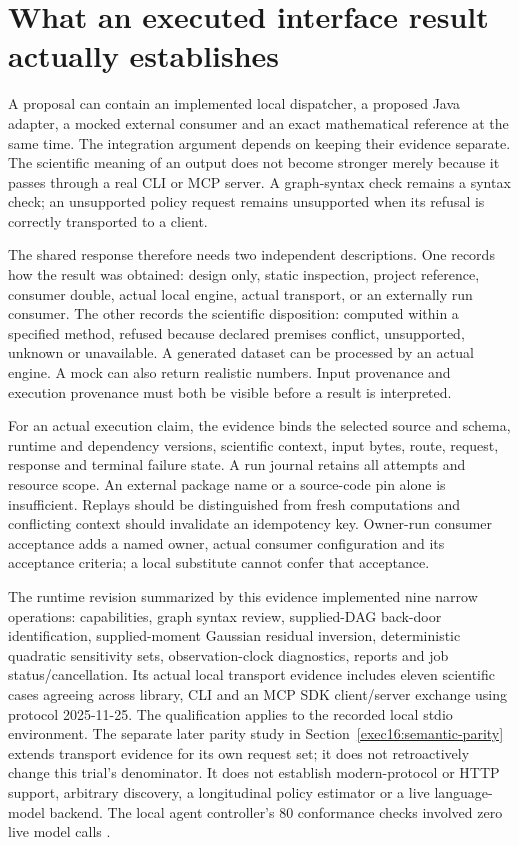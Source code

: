 \section{What an executed interface result actually establishes}
\label{exec14:execution-meaning}

A proposal can contain an implemented local dispatcher, a proposed Java adapter,
a mocked external consumer and an exact mathematical reference at the same time.
The integration argument depends on keeping their evidence separate. The
scientific meaning of an output does not become stronger merely because it
passes through a real CLI or MCP server. A graph-syntax check remains a syntax
check; an unsupported policy request remains unsupported when its refusal is
correctly transported to a client.

The shared response therefore needs two independent descriptions. One records
how the result was obtained: design only, static inspection, project reference,
consumer double, actual local engine, actual transport, or an externally run
consumer. The other records the scientific disposition: computed within a
specified method, refused because declared premises conflict, unsupported,
unknown or unavailable. A generated dataset can be processed by an actual
engine. A mock can also return realistic numbers. Input provenance and execution
provenance must both be visible before a result is interpreted.

For an actual execution claim, the evidence binds the selected source and
schema, runtime and dependency versions, scientific context, input bytes,
route, request, response and terminal failure state. A run journal retains all
attempts and resource scope. An external package name or a source-code pin alone
is insufficient. Replays should be distinguished from fresh computations and
conflicting context should invalidate an idempotency key. Owner-run consumer
acceptance adds a named owner, actual consumer configuration and its acceptance
criteria; a local substitute cannot confer that acceptance.

The runtime revision summarized by this evidence implemented nine narrow operations: capabilities,
graph syntax review, supplied-DAG back-door identification, supplied-moment
Gaussian residual inversion, deterministic quadratic sensitivity sets,
observation-clock diagnostics, reports and job status/cancellation. Its actual
local transport evidence includes eleven scientific cases agreeing across
library, CLI and an MCP SDK client/server exchange using protocol 2025-11-25.
The qualification applies to the recorded local stdio environment. The separate later parity study in Section~\ref{exec16:semantic-parity} extends transport evidence for its own request set; it does not retroactively change this trial's denominator. It does not
establish modern-protocol or HTTP support, arbitrary discovery, a longitudinal
policy estimator or a live language-model backend. The local agent controller's
80 conformance checks involved zero live model calls
\citep{exec14_execution_evidence}.

